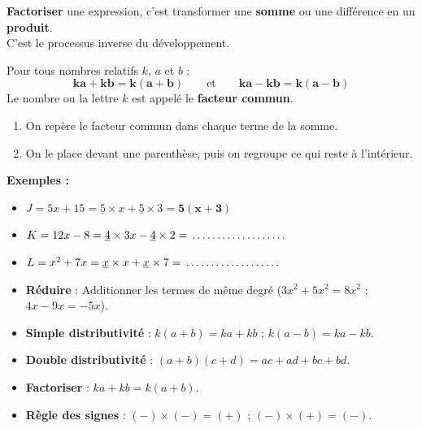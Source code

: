 \begin{cadredef}[Factoriser]
\textbf{Factoriser} une expression, c'est transformer une \textbf{somme} ou une différence en un \textbf{produit}.\\
C'est le processus inverse du développement.
\end{cadredef}

\begin{cadreprop}
Pour tous nombres relatifs $k$, $a$ et $b$ :
\[ \mathbf{ka + kb = k(a + b)} \qquad \text{et} \qquad \mathbf{ka - kb = k(a - b)} \]
Le nombre ou la lettre $k$ est appelé le \textbf{facteur commun}.
\end{cadreprop}

\begin{cadremethode}
\begin{enumerate}
    \item On repère le facteur commun dans chaque terme de la somme.
    \item On le place devant une parenthèse, puis on regroupe ce qui reste à l'intérieur.
\end{enumerate}

\textbf{Exemples :}
\begin{itemize}
    \item $J = 5x + 15 = \underline{5} \times x + \underline{5} \times 3 = \mathbf{5(x + 3)}$
    \item $K = 12x - 8 = \underline{4} \times 3x - \underline{4} \times 2 = \pointille[3cm]$
    \item $L = x^2 + 7x = \underline{x} \times x + \underline{x} \times 7 = \pointille[3cm]$
\end{itemize}
\end{cadremethode}

\begin{cadreretenu}
\begin{itemize}
    \item \textbf{Réduire} : Additionner les termes de même degré ($3x^2 + 5x^2 = 8x^2$ ; $4x - 9x = -5x$).
    \item \textbf{Simple distributivité} : $k(a+b) = ka + kb$ \quad ; \quad $k(a-b) = ka - kb$.
    \item \textbf{Double distributivité} : $(a+b)(c+d) = ac + ad + bc + bd$.
    \item \textbf{Factoriser} : $ka + kb = k(a+b)$.
    \item \textbf{Règle des signes} : $(-) \times (-) = (+)$ \quad ; \quad $(-) \times (+) = (-)$.
\end{itemize}
\end{cadreretenu}

